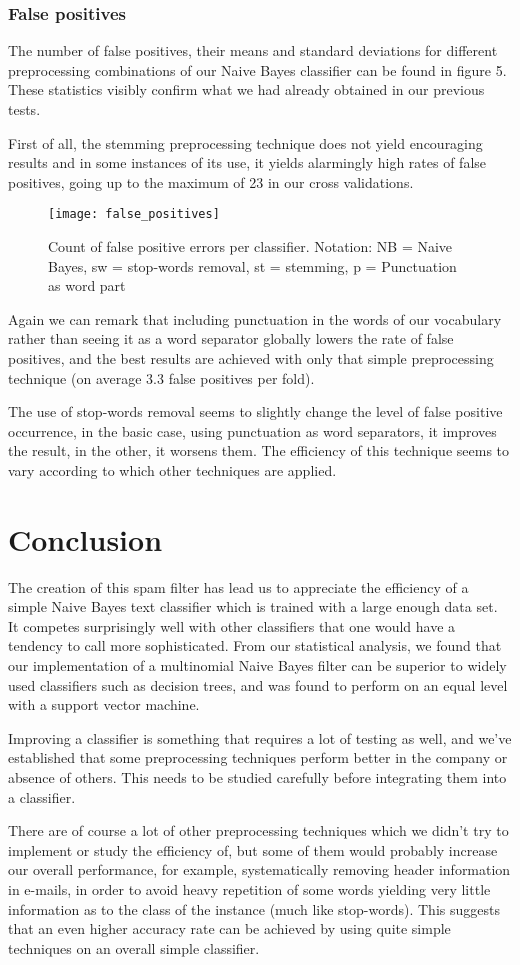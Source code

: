 \documentclass[12pt,a4paper]{report}
\begin{document}
\subsubsection{False positives}

The number of false positives, their means and standard deviations for different preprocessing combinations of our Naive Bayes classifier can be found in figure 5. These statistics visibly confirm what we had already obtained in our previous tests.

First of all, the stemming preprocessing technique does not yield encouraging results and in some instances of its use, it yields alarmingly high rates of false positives, going up to the maximum of 23 in our cross validations. 

\begin{figure}
\texttt{[image: false\_positives]}
\centering
\caption{Count of false positive errors per classifier. Notation: NB = Naive Bayes, sw = stop-words removal, st = stemming, p = Punctuation as word part}
\end{figure}

Again we can remark that including punctuation in the words of our vocabulary rather than seeing it as a word separator globally lowers the rate of false positives, and the best results are achieved with only that simple preprocessing technique (on average 3.3 false positives per fold). 

The use of stop-words removal seems to slightly change the level of false positive occurrence, in the basic case, using punctuation as word separators, it improves the result, in the other, it worsens them. The efficiency of this technique seems to vary according to which other techniques are applied.

\section{Conclusion}
The creation of this spam filter has lead us to appreciate the efficiency of a simple Naive Bayes text classifier which is trained with a large enough data set. It competes surprisingly well with other classifiers that one would have a tendency to call more sophisticated. From our statistical analysis, we found that our implementation of a multinomial Naive Bayes filter can be superior to widely used classifiers such as decision trees, and was found to perform on an equal level with a support vector machine.

Improving a classifier is something that requires a lot of testing as well, and we've established that some preprocessing techniques perform better in the company or absence of others. This needs to be studied carefully before integrating them into a classifier.

There are of course a lot of other preprocessing techniques which we didn't try to implement or study the efficiency of, but some of them would probably increase our overall performance, for example, systematically removing header information in e-mails, in order to avoid heavy repetition of some words yielding very little information as to the class of the instance (much like stop-words). This suggests that an even higher accuracy rate can be achieved by using quite simple techniques on an overall simple classifier.
\end{document}
